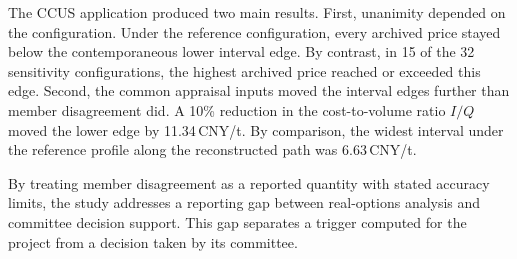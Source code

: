 \documentclass[5p,times,authoryear]{elsarticle}
\theoremstyle{plain}
\begin{document}
The CCUS application produced two main results. First, unanimity depended on the configuration. Under the reference configuration, every archived price stayed below the contemporaneous lower interval edge. By contrast, in 15 of the 32 sensitivity configurations, the highest archived price reached or exceeded this edge. Second, the common appraisal inputs moved the interval edges further than member disagreement did. A 10\% reduction in the cost-to-volume ratio $I/Q$ moved the lower edge by 11.34\,CNY/t. By comparison, the widest interval under the reference profile along the reconstructed path was 6.63\,CNY/t.

By treating member disagreement as a reported quantity with stated accuracy limits, the study addresses a reporting gap between real-options analysis and committee decision support. This gap separates a trigger computed for the project from a decision taken by its committee.
\end{document}
